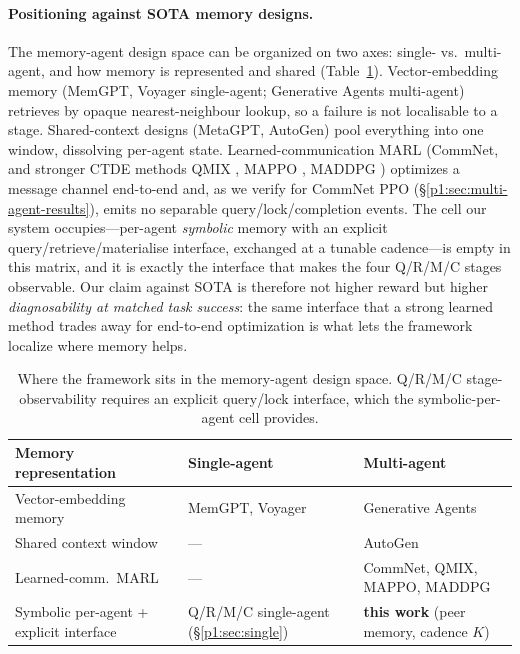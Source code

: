 \documentclass{article}
\begin{document}
\paragraph{Positioning against SOTA memory designs.}
The memory-agent design space can be organized on two axes: single- vs.\ multi-agent, and how memory is represented and shared (Table~\ref{p1:tab:sota-quadrants}). Vector-embedding memory (MemGPT, Voyager single-agent; Generative Agents multi-agent) retrieves by opaque nearest-neighbour lookup, so a failure is not localisable to a stage. Shared-context designs (MetaGPT, AutoGen) pool everything into one window, dissolving per-agent state. Learned-communication MARL (CommNet, and stronger CTDE methods QMIX \citep{rashid2018qmix}, MAPPO \citep{yu2022mappo}, MADDPG \citep{lowe2017maddpg}) optimizes a message channel end-to-end and, as we verify for CommNet PPO (\S\ref{p1:sec:multi-agent-results}), emits no separable query/lock/completion events. The cell our system occupies---per-agent \emph{symbolic} memory with an explicit query/retrieve/materialise interface, exchanged at a tunable cadence---is empty in this matrix, and it is exactly the interface that makes the four Q/R/M/C stages observable. Our claim against SOTA is therefore not higher reward but higher \emph{diagnosability at matched task success}: the same interface that a strong learned method trades away for end-to-end optimization is what lets the framework localize where memory helps.

\begin{table}[h]
\caption{Where the framework sits in the memory-agent design space. Q/R/M/C stage-observability requires an explicit query/lock interface, which the symbolic-per-agent cell provides.}
\label{p1:tab:sota-quadrants}
\centering
\small
\begin{tabular}{p{3.1cm} p{4.3cm} p{4.3cm}}
\toprule
Memory representation & Single-agent & Multi-agent \\
\midrule
Vector-embedding memory & MemGPT, Voyager \citep{packer2023memgpt,wang2023voyager} & Generative Agents \citep{park2023generative} \\
Shared context window & --- & AutoGen \citep{wu2023autogen} \\
Learned-comm.\ MARL & --- & CommNet, QMIX, MAPPO, MADDPG \citep{sukhbaatar2016commnet,rashid2018qmix,yu2022mappo,lowe2017maddpg} \\
Symbolic per-agent + explicit interface & Q/R/M/C single-agent (\S\ref{p1:sec:single}) & \textbf{this work} (peer memory, cadence $K$) \\
\bottomrule
\end{tabular}
\end{table}
\end{document}
